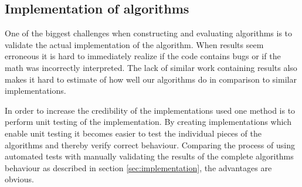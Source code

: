 \subsection{Implementation of algorithms}

One of the biggest challenges when constructing and evaluating algorithms is to
validate the actual implementation of the algorithm. When results seem 
erroneous it is hard to immediately realize if the code contains bugs or if the 
math was incorrectly interpreted. The lack of similar work containing results
also makes it hard to estimate of how well our algorithms do in comparison 
to similar implementations.

In order to increase the credibility of the implementations used one method is
to perform unit testing of the implementation. By creating implementations
which enable unit testing it becomes easier to test the individual pieces of
the algorithms and thereby verify correct behaviour. Comparing the process of
using automated tests with manually validating the results of the complete
algorithms behaviour as described in section \ref{sec:implementation}, the
advantages are obvious.
